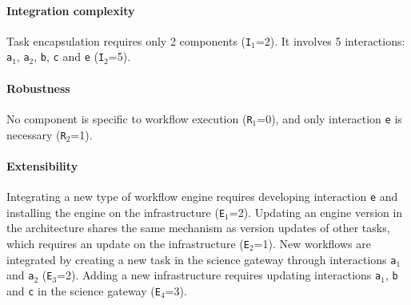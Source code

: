 \documentclass[preprint,3p,twocolumn]{elsarticle}
\newcommand{\todo}[2]{\pdfmargincomment[color=red,author=#1,open=true]{#2}}
\newcommand{\closedanswerednote}[6]{}
\begin{document}
\paragraph{Integration complexity} Task encapsulation requires only 2
components (\texttt{I$_1$}=2).  It involves 5 interactions:
\texttt{a$_1$}, \texttt{a$_2$}, \texttt{b}, \texttt{c} and
\texttt{e} (\texttt{I$_2$}=5).

\paragraph{Robustness} No component is specific to workflow execution
(\texttt{R$_1$}=0), and only interaction \texttt{e} is necessary
(\texttt{R$_2$}=1)\closedanswerednote{sorina}{I understand why this is 1
  (and why interactions c and b are not counted here), but I wonder
  whether we can simply ignore these interactions because they are not
  specific to workflow execution. As far as robustness is concerned,
  the transfers have to be successful anyway...}{Tristan}{We cannot
  just ignore these interactions in the architecture because they are
  required for the system to work. The transfers have to be successful
  but data movements in the workflow will use the same code as data
  movements done in the science gateway, which will make this
  architecture more robust than service for instance. In VIP, for
  instance, the code used in the GASW wrapper to transfer data (c2) is
  completely independent from the ``file transfer'' module in the
  platform (c1), which is detrimental to robustness}{Tristan}{Closed,
  see github issue \#7.}.

\paragraph{Extensibility} Integrating a new type of workflow engine
requires developing interaction \texttt{e} and  installing the engine
on the infrastructure (\texttt{E$_1$}=2). Updating an engine version
in the architecture shares the same mechanism as version updates of
other tasks, which requires an update on the
infrastructure (\texttt{E$_2$}=1).  New workflows are integrated by
creating a new task in the science gateway through interactions
\texttt{a$_1$} and \texttt{a$_2$} (\texttt{E$_3$}=2). Adding a new
infrastructure requires updating interactions \texttt{a$_1$},
\texttt{b} and \texttt{c} in the science gateway (\texttt{E$_4$}=3).

\end{document}
